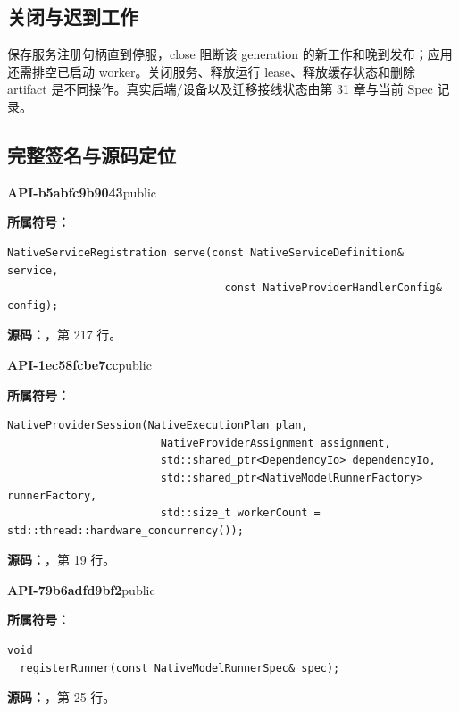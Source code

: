 \subsection{关闭与迟到工作}
保存服务注册句柄直到停服，close 阻断该 generation 的新工作和晚到发布；应用还需排空已启动 worker。关闭服务、释放运行 lease、释放缓存状态和删除 artifact 是不同操作。真实后端/设备以及迁移接线状态由第 31 章与当前 Spec 记录。

\subsection{完整签名与源码定位}

\textbf{API-b5abfc9b9043}\quad public\par
\textbf{所属符号：}\par
\begin{Verbatim}[fontsize=\footnotesize,breaklines,breakanywhere]
NativeServiceRegistration serve(const NativeServiceDefinition& service,
                                  const NativeProviderHandlerConfig& config);
\end{Verbatim}
\textbf{源码：}，第 217 行。\par

\textbf{API-1ec58fcbe7cc}\quad public\par
\textbf{所属符号：}\par
\begin{Verbatim}[fontsize=\footnotesize,breaklines,breakanywhere]
NativeProviderSession(NativeExecutionPlan plan,
                        NativeProviderAssignment assignment,
                        std::shared_ptr<DependencyIo> dependencyIo,
                        std::shared_ptr<NativeModelRunnerFactory> runnerFactory,
                        std::size_t workerCount = std::thread::hardware_concurrency());
\end{Verbatim}
\textbf{源码：}，第 19 行。\par

\textbf{API-79b6adfd9bf2}\quad public\par
\textbf{所属符号：}\par
\begin{Verbatim}[fontsize=\footnotesize,breaklines,breakanywhere]
void
  registerRunner(const NativeModelRunnerSpec& spec);
\end{Verbatim}
\textbf{源码：}，第 25 行。\par

